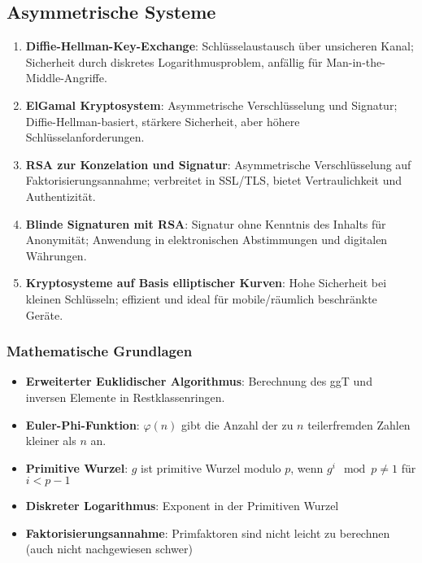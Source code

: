 \documentclass{article}
\begin{document}
\subsection{Asymmetrische Systeme}
\begin{enumerate}
  \item \textbf{Diffie-Hellman-Key-Exchange}: Schlüsselaustausch über unsicheren Kanal; Sicherheit durch diskretes Logarithmusproblem, anfällig für Man-in-the-Middle-Angriffe.
  \item \textbf{ElGamal Kryptosystem}: Asymmetrische Verschlüsselung und Signatur; Diffie-Hellman-basiert, stärkere Sicherheit, aber höhere Schlüsselanforderungen.
  \item \textbf{RSA zur Konzelation und Signatur}: Asymmetrische Verschlüsselung auf Faktorisierungsannahme; verbreitet in SSL/TLS, bietet Vertraulichkeit und Authentizität.
  \item \textbf{Blinde Signaturen mit RSA}: Signatur ohne Kenntnis des Inhalts für Anonymität; Anwendung in elektronischen Abstimmungen und digitalen Währungen.
  \item \textbf{Kryptosysteme auf Basis elliptischer Kurven}: Hohe Sicherheit bei kleinen Schlüsseln; effizient und ideal für mobile/räumlich beschränkte Geräte.
\end{enumerate}

\subsubsection{Mathematische Grundlagen}
\begin{itemize}
  \item \textbf{Erweiterter Euklidischer Algorithmus}: Berechnung des ggT und inversen Elemente in Restklassenringen.
  \item \textbf{Euler-Phi-Funktion}: $\varphi(n)$ gibt die Anzahl der zu $n$ teilerfremden Zahlen kleiner als $n$ an.
  \item \textbf{Primitive Wurzel}: $g$ ist primitive Wurzel modulo $p$, wenn $g^i \mod p \neq 1$ für $i < p-1$
  \item \textbf{Diskreter Logarithmus}: Exponent in der Primitiven Wurzel
  \item \textbf{Faktorisierungsannahme}: Primfaktoren sind nicht leicht zu berechnen (auch nicht nachgewiesen schwer)
\end{itemize}
\end{document}

